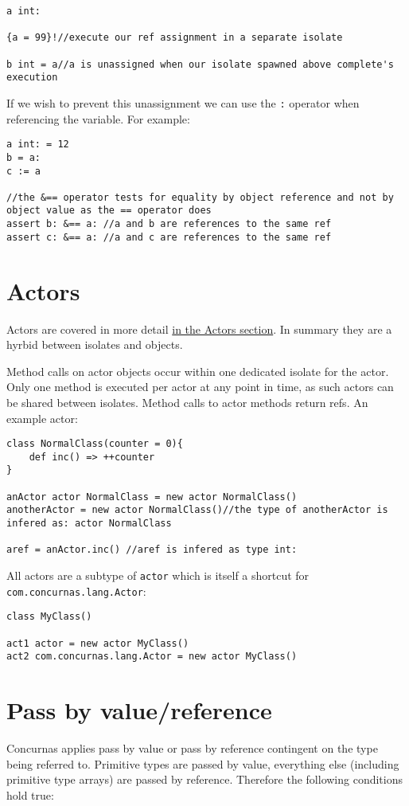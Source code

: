 \documentclass[conc-doc]{subfiles}
\begin{document}
\begin{lstlisting}
a int:

{a = 99}!//execute our ref assignment in a separate isolate

b int = a//a is unassigned when our isolate spawned above complete's execution
\end{lstlisting}

If we wish to prevent this unassignment we can use the \lstinline{:} operator when referencing the variable. For example:

\begin{lstlisting}
a int: = 12
b = a:
c := a

//the &== operator tests for equality by object reference and not by object value as the == operator does
assert b: &== a: //a and b are references to the same ref
assert c: &== a: //a and c are references to the same ref
\end{lstlisting}


\section{Actors}
Actors are covered in more detail \hyperref[sec:actors]{in the Actors section}. In summary they are a hyrbid between isolates and objects.

Method calls on actor objects occur within one dedicated isolate for the actor. Only one method is executed per actor at any point in time, as such actors can be shared between isolates. Method calls to actor methods return refs. An example actor:

\begin{lstlisting}
class NormalClass(counter = 0){
	def inc() => ++counter
}

anActor actor NormalClass = new actor NormalClass()
anotherActor = new actor NormalClass()//the type of anotherActor is infered as: actor NormalClass

aref = anActor.inc() //aref is infered as type int:
\end{lstlisting}

All actors are a subtype of \lstinline{actor} which is itself a shortcut for \lstinline{com.concurnas.lang.Actor}:

\begin{lstlisting}
class MyClass()

act1 actor = new actor MyClass()
act2 com.concurnas.lang.Actor = new actor MyClass()	
\end{lstlisting}

\section{Pass by value/reference}
Concurnas applies pass by value or pass by reference contingent on the type being referred to. Primitive types are passed by value, everything else (including primitive type arrays) are passed by reference. Therefore the following conditions hold true:
\end{document}
